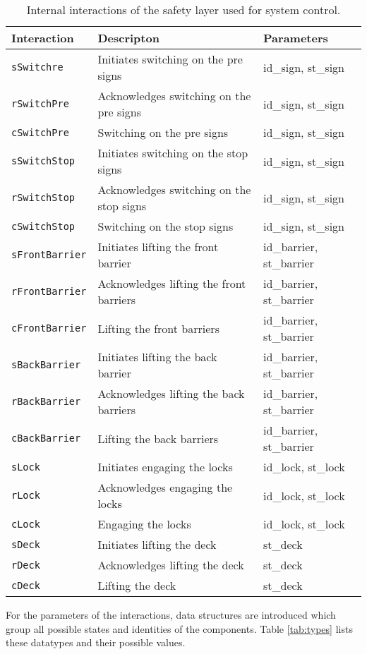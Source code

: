 %
\begin{table}%
\begin{tabular}{lll}
			\textbf{Interaction} &	\textbf{Descripton}	&	\textbf{Parameters}\\
  		\hline
  		
			\texttt{sSwitchre} & Initiates switching on the pre signs & id\_sign, st\_sign\\
      \texttt{rSwitchPre} & Acknowledges switching on the pre signs & id\_sign, st\_sign\\
      \texttt{cSwitchPre} & Switching on the pre signs & id\_sign, st\_sign\\
            
      \texttt{sSwitchStop} & Initiates switching on the stop signs & id\_sign, st\_sign\\
      \texttt{rSwitchStop} & Acknowledges switching on the stop signs & id\_sign, st\_sign\\
      \texttt{cSwitchStop} & Switching on the stop signs & id\_sign, st\_sign\\
            
      \texttt{sFrontBarrier} & Initiates lifting the front barrier & id\_barrier, st\_barrier\\
      \texttt{rFrontBarrier} & Acknowledges lifting the front barriers & id\_barrier, st\_barrier\\
      \texttt{cFrontBarrier} & Lifting the front barriers & id\_barrier, st\_barrier\\
      
      \texttt{sBackBarrier} & Initiates lifting the back barrier & id\_barrier, st\_barrier\\
      \texttt{rBackBarrier} & Acknowledges lifting the back barriers & id\_barrier, st\_barrier\\
      \texttt{cBackBarrier} & Lifting the back barriers & id\_barrier, st\_barrier\\
      
      \texttt{sLock} & Initiates engaging the locks & id\_lock, st\_lock\\
      \texttt{rLock} & Acknowledges engaging the locks & id\_lock, st\_lock\\
      \texttt{cLock} & Engaging the locks & id\_lock, st\_lock\\
      
      \texttt{sDeck} & Initiates lifting the deck & st\_deck\\
      \texttt{rDeck} & Acknowledges lifting the deck & st\_deck\\
      \texttt{cDeck} & Lifting the deck & st\_deck\\
\end{tabular}
\caption{Internal interactions of the safety layer used for system control.}
\label{tab:tau}
\end{table}
%
For the parameters of the interactions, data structures are introduced which group all possible states and identities of the components. Table \ref{tab:types} lists these datatypes and their possible values.

